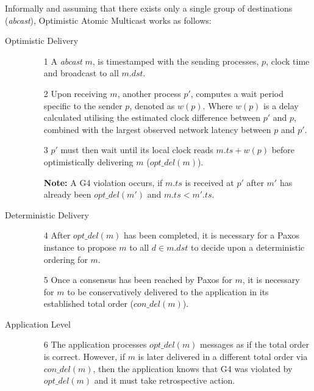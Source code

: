     Informally and assuming that there exists only a single group of destinations (\emph{abcast}), Optimistic Atomic Multicast works as follows:
    \begin{description}
        \item[Optimistic Delivery] \hfill
            \begin{enumerate}
                \item[1]    A \emph{abcast} $m$, is timestamped with the sending processes, $p$, clock time and broadcast to all $m.dst$.  
                
                \item[2]    Upon receiving $m$, another process $p'$, computes a wait period specific to the sender $p$, denoted as $w(p)$.  Where $w(p)$ is a delay calculated utilising the estimated clock difference between $p'$ and $p$, combined with the largest observed network latency between $p$ and $p'$.  
                
                \item[3]    $p'$ must then wait until its local clock reads $m.ts + w(p)$ before optimistically delivering $m$ ($opt\_del(m)$).  

                \textbf{Note:} A G4 violation occurs, if $m.ts$ is received at $p'$ after $m'$ has already been $opt\_del(m')$ and $m.ts < m'.ts$.  
            \end{enumerate}
        
        \item[Deterministic Delivery] \hfill
            \begin{enumerate}
                \item[4]    After $opt\_del(m)$ has been completed, it is necessary for a Paxos instance to propose $m$ to all $d \in m.dst$ to decide upon a deterministic ordering for $m$.  
                
                \item[5]    Once a consensus has been reached by Paxos for $m$, it is necessary for $m$ to be conservatively delivered to the application in its established total order ($con\_del(m)$).    
            \end{enumerate}
            
        \item[Application Level] \hfill
            \begin{enumerate}
                \item[6]    The application processes $opt\_del(m)$ messages as if the total order is correct.  However, if $m$ is later delivered in a different total order via $con\_del(m)$, then the application knows that G4 was violated by $opt\_del(m)$ and it must take retrospective action.  
            \end{enumerate}
    \end{description}
    \noindent\makebox[\linewidth]{\rule{\textwidth}{0.4pt}}

